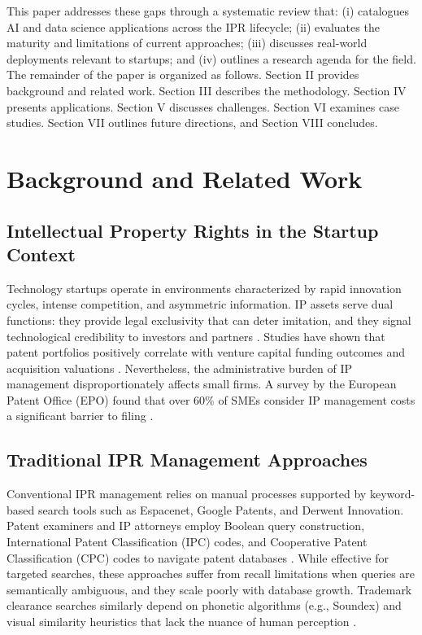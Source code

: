 \documentclass[conference]{IEEEtran}
\begin{document}
This paper addresses these gaps through a systematic review that: (i) catalogues AI and data science applications across the IPR lifecycle; (ii) evaluates the maturity and limitations of current approaches; (iii) discusses real-world deployments relevant to startups; and (iv) outlines a research agenda for the field. The remainder of the paper is organized as follows. Section II provides background and related work. Section III describes the methodology. Section IV presents applications. Section V discusses challenges. Section VI examines case studies. Section VII outlines future directions, and Section VIII concludes.

\section{Background and Related Work}

\subsection{Intellectual Property Rights in the Startup Context}

Technology startups operate in environments characterized by rapid innovation cycles, intense competition, and asymmetric information. IP assets serve dual functions: they provide legal exclusivity that can deter imitation, and they signal technological credibility to investors and partners \cite{ref9}. Studies have shown that patent portfolios positively correlate with venture capital funding outcomes and acquisition valuations \cite{ref10}. Nevertheless, the administrative burden of IP management disproportionately affects small firms. A survey by the European Patent Office (EPO) found that over 60\% of SMEs consider IP management costs a significant barrier to filing \cite{ref11}.

\subsection{Traditional IPR Management Approaches}

Conventional IPR management relies on manual processes supported by keyword-based search tools such as Espacenet, Google Patents, and Derwent Innovation. Patent examiners and IP attorneys employ Boolean query construction, International Patent Classification (IPC) codes, and Cooperative Patent Classification (CPC) codes to navigate patent databases \cite{ref12}. While effective for targeted searches, these approaches suffer from recall limitations when queries are semantically ambiguous, and they scale poorly with database growth. Trademark clearance searches similarly depend on phonetic algorithms (e.g., Soundex) and visual similarity heuristics that lack the nuance of human perception \cite{ref13}.
\end{document}
